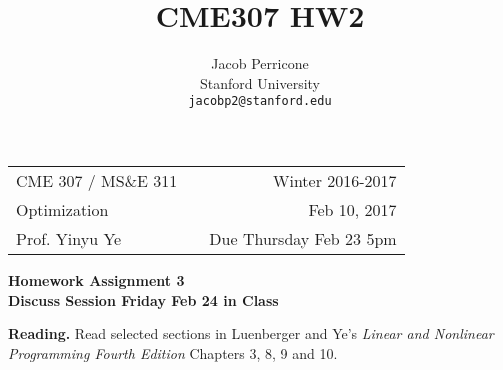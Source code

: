 \documentclass{article} %
\title{CME307 HW2}
\author{
Jacob Perricone\\
Stanford University\\
\texttt{jacobp2@stanford.edu} \\
}
\begin{document}
\pagestyle{empty}
\def \NATUR{ I \hspace*{-0.8ex} N}
\def \REALES{ I \hspace*{-0.8ex} R}
\renewcommand{\labelenumi}{\alph{enumi})}
\renewcommand{\labelenumii}{\roman{enumii})}


\hspace{-6mm}
\begin{tabular}{lcr}
CME 307 / MS\&E 311 & \hspace{3in} & Winter 2016-2017 \\ Optimization & & Feb 10, 2017 \\
Prof. Yinyu Ye & & Due Thursday Feb 23 5pm
\end{tabular}

\bigskip

\begin{center}
{\large \bf Homework Assignment 3 \\  Discuss Session Friday Feb 24 in Class}
\end{center}


\bigskip

{\textbf{Reading.}} Read selected sections in Luenberger and Ye's {\sl Linear
and Nonlinear Programming Fourth Edition} Chapters 3, 8, 9 and 10.
\end{document}

